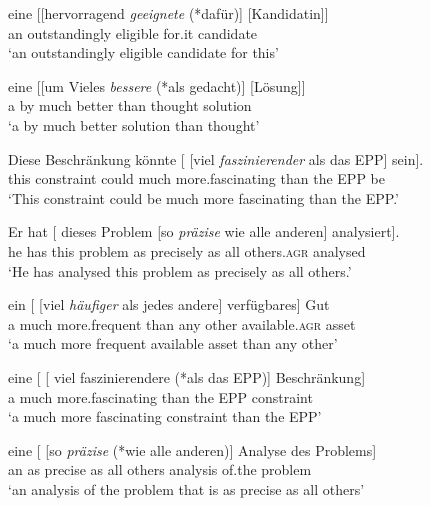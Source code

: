 \documentclass[output=paper
  ,nobabel
  ,uniformtopskip %
]{langscibook}
\begin{document}
\eal\label{ex-headinitialphr}
\ex
\gll eine [[hervorragend \emph{geeignete} (*dafür)] [Kandidatin]] \\
an	\hphantom{[[}outstandingly eligible \hphantom{(*}for.it \spacebr{}candidate \\
\glt `an outstandingly eligible candidate for this'

\ex
\gll eine [[um Vieles \emph{bessere} (*als gedacht)] [Lösung]] \\
a \hphantom{[[}by much better \hphantom{(*}than thought \spacebr{}solution   \\
\glt `a by much better solution than thought'


\zl

\eal\label{ex-dutchgerman}
\ex\label{ex-kandidatin}
\gll Diese Beschränkung könnte [ [viel \emph{faszinierender} als das EPP] sein]. \\
     this constraint    could  {}        \spacebr{}much more.fascinating than the EPP be \\
\glt `This constraint could be much more fascinating than the EPP.'

\ex
\gll Er hat [ dieses Problem [so \emph{präzise} wie alle anderen] analysiert].  \\
     he has {}        this problem \spacebr{}as precisely as all others\textsc{.agr} analysed  \\
\glt `He has analysed this problem as precisely as all others.'

\ex\label{ex-lösung}
\gll ein [ [viel \emph{häufiger} als jedes andere] verfügbares] Gut  \\
     a   {}        \spacebr{}much more.frequent than any other available\textsc{.agr} asset  \\
\glt `a much more frequent available asset than any other'

\ex
\gll eine [ [ viel faszinierendere (*als das EPP)] Beschränkung] \\
     a    {}        {}        much more.fascinating \hphantom{(*}than the EPP constraint \\
\glt `a much more fascinating constraint than the EPP'

\ex
\gll eine [ [so \emph{präzise} (*wie alle anderen)] Analyse des Problems] \\
     an   {}        \spacebr{}as precise \hphantom{(*}as all others analysis of.the problem \\
\glt `an analysis of the problem that is as precise as all others'
\end{document}
